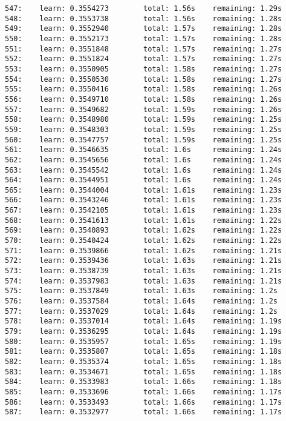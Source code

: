 \documentclass[11pt]{article}
\begin{document}
\begin{Verbatim}[commandchars=\\\{\}]
547:    learn: 0.3554273        total: 1.56s    remaining: 1.29s
548:    learn: 0.3553738        total: 1.56s    remaining: 1.28s
549:    learn: 0.3552940        total: 1.57s    remaining: 1.28s
550:    learn: 0.3552173        total: 1.57s    remaining: 1.28s
551:    learn: 0.3551848        total: 1.57s    remaining: 1.27s
552:    learn: 0.3551824        total: 1.57s    remaining: 1.27s
553:    learn: 0.3550905        total: 1.58s    remaining: 1.27s
554:    learn: 0.3550530        total: 1.58s    remaining: 1.27s
555:    learn: 0.3550416        total: 1.58s    remaining: 1.26s
556:    learn: 0.3549710        total: 1.58s    remaining: 1.26s
557:    learn: 0.3549682        total: 1.59s    remaining: 1.26s
558:    learn: 0.3548980        total: 1.59s    remaining: 1.25s
559:    learn: 0.3548303        total: 1.59s    remaining: 1.25s
560:    learn: 0.3547757        total: 1.59s    remaining: 1.25s
561:    learn: 0.3546635        total: 1.6s     remaining: 1.24s
562:    learn: 0.3545656        total: 1.6s     remaining: 1.24s
563:    learn: 0.3545542        total: 1.6s     remaining: 1.24s
564:    learn: 0.3544951        total: 1.6s     remaining: 1.24s
565:    learn: 0.3544004        total: 1.61s    remaining: 1.23s
566:    learn: 0.3543246        total: 1.61s    remaining: 1.23s
567:    learn: 0.3542105        total: 1.61s    remaining: 1.23s
568:    learn: 0.3541613        total: 1.61s    remaining: 1.22s
569:    learn: 0.3540893        total: 1.62s    remaining: 1.22s
570:    learn: 0.3540424        total: 1.62s    remaining: 1.22s
571:    learn: 0.3539866        total: 1.62s    remaining: 1.21s
572:    learn: 0.3539436        total: 1.63s    remaining: 1.21s
573:    learn: 0.3538739        total: 1.63s    remaining: 1.21s
574:    learn: 0.3537983        total: 1.63s    remaining: 1.21s
575:    learn: 0.3537849        total: 1.63s    remaining: 1.2s
576:    learn: 0.3537584        total: 1.64s    remaining: 1.2s
577:    learn: 0.3537029        total: 1.64s    remaining: 1.2s
578:    learn: 0.3537014        total: 1.64s    remaining: 1.19s
579:    learn: 0.3536295        total: 1.64s    remaining: 1.19s
580:    learn: 0.3535957        total: 1.65s    remaining: 1.19s
581:    learn: 0.3535807        total: 1.65s    remaining: 1.18s
582:    learn: 0.3535374        total: 1.65s    remaining: 1.18s
583:    learn: 0.3534671        total: 1.65s    remaining: 1.18s
584:    learn: 0.3533983        total: 1.66s    remaining: 1.18s
585:    learn: 0.3533696        total: 1.66s    remaining: 1.17s
586:    learn: 0.3533493        total: 1.66s    remaining: 1.17s
587:    learn: 0.3532977        total: 1.66s    remaining: 1.17s

\end{Verbatim}
\end{document}
